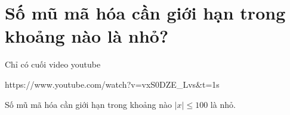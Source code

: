 \documentclass{article}
\begin{document}

\section{Số mũ mã hóa cần giới hạn trong khoảng nào là nhỏ?}



Chỉ có cuối video youtube

https://www.youtube.com/watch?v=vxS0DZE_Lvs&t=1s

Số mũ mã hóa cần giới hạn trong khoảng nào $|x| \leq 100$ là nhỏ.

\end{document}
